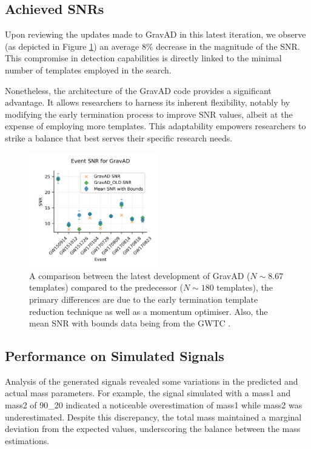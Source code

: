 \documentclass[twocolumn, aps, pra]{revtex4-2}
\begin{document}
	\subsection{Achieved SNRs}

Upon reviewing the updates made to GravAD in this latest iteration, we observe (as depicted in Figure \ref{fig:snr_comps}) an average $8\%$ decrease in the magnitude of the SNR. This compromise in detection capabilities is directly linked to the minimal number of templates employed in the search.

Nonetheless, the architecture of the GravAD code provides a significant advantage. It allows researchers to harness its inherent flexibility, notably by modifying the early termination process to improve SNR values, albeit at the expense of employing more templates. This adaptability empowers researchers to strike a balance that best serves their specific research needs.

	\begin{figure}
	\centering
	\includegraphics[width=0.5\textwidth]{snr_comps.png}
	\caption{A comparison between the latest development of GravAD ($N \sim 8.67$ templates) compared to the predecessor ($N \sim 180$ templates), the primary differences are due to the early termination template reduction technique as well as a momentum optimiser. Also, the mean SNR with bounds data being from the GWTC \cite{gwtc}.}
	\label{fig:snr_comps}
\end{figure}

	\subsection{Performance on Simulated Signals}

Analysis of the generated signals revealed some variations in the predicted and actual mass parameters. For example, the signal simulated with a mass1 and mass2 of 90\_20 indicated a noticeable overestimation of mass1 while mass2 was underestimated. Despite this discrepancy, the total mass maintained a marginal deviation from the expected values, underscoring the balance between the mass estimations.
\end{document}
